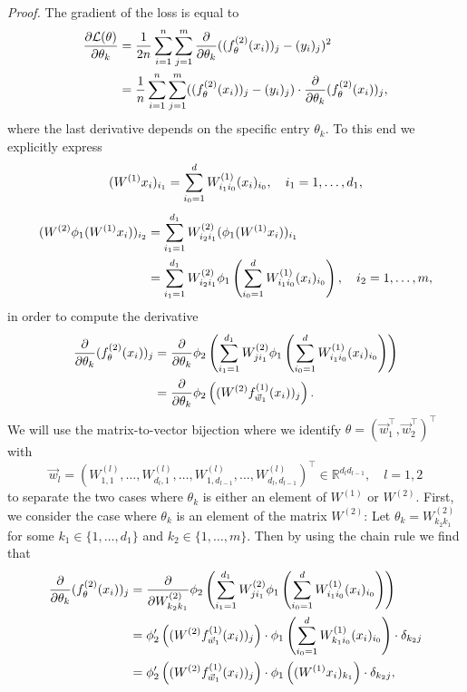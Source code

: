 \documentclass{article}
\begin{document}
\bigskip
\\
\emph{Proof.}
The gradient of the loss is equal to
\begin{align}
\frac{\partial\mathcal{L}(\theta)}{\partial \theta_k} &= \frac{1}{2n}\sum_{i=1}^n\sum_{j=1}^m\frac{\partial}{\partial\theta_k}((f_\theta^{(2)}(x_i))_j-(y_i)_j)^2 \notag
\\&= \frac{1}{n}\sum_{i=1}^n\sum_{j=1}^m((f_\theta^{(2)}(x_i))_j-(y_i)_j)\cdot\frac{\partial}{\partial\theta_k}(f_\theta^{(2)}(x_i))_j,
\end{align}
where the last derivative depends on the specific entry $\theta_k$. To this end we explicitly express
\begin{equation}
({W^{(1)}} x_i)_{i_1} = \sum_{{i_0}=1}^dW^{(1)}_{i_1 i_0}(x_i)_{i_0},\quad i_1=1,\dots,d_1, \notag
\end{equation}
\begin{align}
({W^{(2)}}\phi_1({W^{(1)}} x_i))_{i_2} &= \sum_{{i_1}=1}^{d_1}W_{{i_2}{i_1}}^{(2)}(\phi_1({W^{(1)}} x_i))_{i_1} \notag
\\ &= \sum_{i_1=1}^{d_1}W_{{i_2}{i_1}}^{(2)}\phi_1\left(\sum_{i_0=1}^dW_{{i_1}i_0}^{(1)}(x_i)_{i_0}\right), \quad i_2=1,\dots, m,
\end{align}
in order to compute the derivative
\begin{align}
\frac{\partial}{\partial\theta_k}(f_\theta^{(2)}(x_i))_j &= \frac{\partial}{\partial\theta_k}\phi_2\left(\sum_{i_1=1}^{d_1}W_{{j}{i_1}}^{(2)}\phi_1\left(\sum_{i_0=1}^dW_{{i_1}i_0}^{(1)}(x_i)_{i_0}\right)\right) \notag
\\ &=\frac{\partial}{\partial\theta_k}\phi_2\left((W^{(2)}f_{\vec{w}_1}^{(1)}(x_i))_j\right).
\end{align}
We will use the matrix-to-vector bijection where we identify $\theta=(\vec{w}_1^\top,\vec{w}_2^\top)^\top$ with
\begin{equation}
\vec{w}_l=(W^{(l)}_{1,1},\dots,W^{(l)}_{d_l,1},\dots,W^{(l)}_{1,d_{l-1}},\dots,W^{(l)}_{d_l,d_{l-1}})^\top\in\mathbb{R}^{d_ld_{l-1}}, \quad l=1,2
\end{equation}
to separate the two cases where $\theta_k$ is either an element of $W^{(1)}$ or $W^{(2)}$. First, we consider the case where $\theta_k$ is an element of the matrix $W^{(2)}$:
Let $\theta_k=W_{k_2 k_1}^{(2)}$ for some $k_1\in\{1,\dots, d_1\}$ and $k_2\in\{1,\dots,m\}$. Then by using the chain rule we find that
\begin{align}
\frac{\partial}{\partial\theta_k}(f_\theta^{(2)}(x_i))_j &= \frac{\partial}{\partial W_{k_2 k_1}^{(2)}}\phi_2\left(\sum_{i_1=1}^{d_1}W_{{j}{i_1}}^{(2)}\phi_1\left(\sum_{i_0=1}^dW_{{i_1}i_0}^{(1)}(x_i)_{i_0}\right)\right) \notag
\\ &= \phi_2'\left((W^{(2)}f_{\vec{w}_1}^{(1)}(x_i))_j\right)\cdot \phi_1\left(\sum_{i_0=1}^dW_{{k_1}i_0}^{(1)}(x_i)_{i_0}\right)\cdot\delta_{k_2j} \notag
\\ &= \phi_2'\left((W^{(2)}f_{\vec{w}_1}^{(1)}(x_i))_j\right)\cdot \phi_1\left((W^{(1)}x_i)_{k_1}\right)\cdot\delta_{k_2j},
\end{align}
\end{document}
